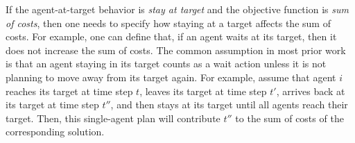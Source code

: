 \documentclass[letterpaper]{article} %
\newcommand{\comment}[1]{{\nb{\textbf{Comment:}}{orange}{#1}}}
\begin{document}

If the agent-at-target behavior is \emph{stay at target} and the objective function is \emph{sum of costs}, then one needs to specify how  staying at a target affects the sum of costs. For example, one can define that, if an agent waits at its target, then it does not increase the sum of costs. The common assumption in most prior work is that an agent staying in its target counts as a wait action unless it is not planning to move away from its target again. For example, assume that agent $i$ reaches its target at time step $t$, leaves its target at time step $t'$, arrives back at its target at time step $t''$,
and then stays at its target until all agents reach their target.
Then, this single-agent plan will contribute $t''$ to the sum of costs of the corresponding solution.
\end{document}
